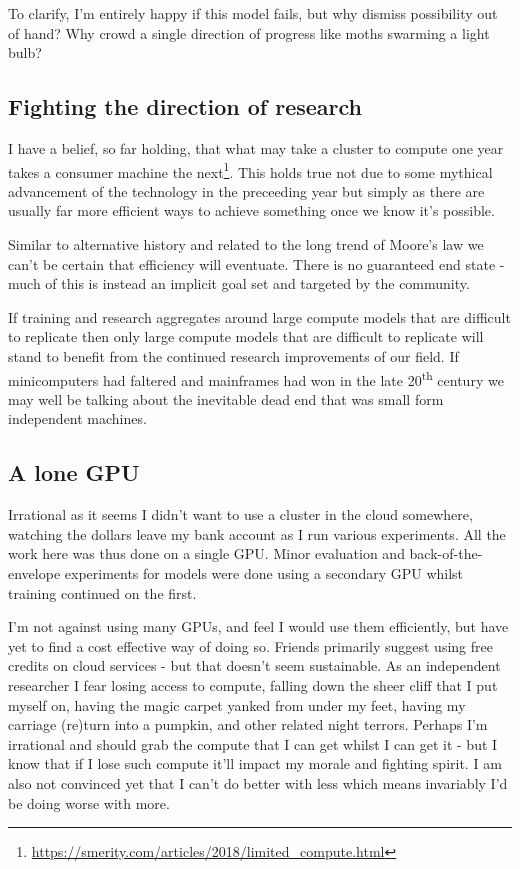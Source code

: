 \documentclass{article}
\begin{document}
To clarify, I'm entirely happy if this model fails, but why dismiss possibility out of hand?
Why crowd a single direction of progress like moths swarming a light bulb?

\subsection{Fighting the direction of research}

I have a belief, so far holding, that what may take a cluster to compute one year takes a consumer machine the next\footnote{\url{https://smerity.com/articles/2018/limited_compute.html}}.
This holds true not due to some mythical advancement of the technology in the preceeding year but simply as there are usually far more efficient ways to achieve something once we know it's possible.

Similar to alternative history and related to the long trend of Moore's law we can't be certain that efficiency will eventuate.
There is no guaranteed end state - much of this is instead an implicit goal set and targeted by the community.

If training and research aggregates around large compute models that are difficult to replicate then only large compute models that are difficult to replicate will stand to benefit from the continued research improvements of our field.
If minicomputers had faltered and mainframes had won in the late 20\textsuperscript{th} century we may well be talking about the inevitable dead end that was small form independent machines.


\subsection{A lone GPU}

Irrational as it seems I didn't want to use a cluster in the cloud somewhere, watching the dollars leave my bank account as I run various experiments.
All the work here was thus done on a single GPU.
Minor evaluation and back-of-the-envelope experiments for models were done using a secondary GPU whilst training continued on the first.

I'm not against using many GPUs, and feel I would use them efficiently, but have yet to find a cost effective way of doing so.
Friends primarily suggest using free credits on cloud services - but that doesn't seem sustainable.
As an independent researcher I fear losing access to compute, falling down the sheer cliff that I put myself on, having the magic carpet yanked from under my feet, having my carriage (re)turn into a pumpkin, and other related night terrors.
Perhaps I'm irrational and should grab the compute that I can get whilst I can get it - but I know that if I lose such compute it'll impact my morale and fighting spirit.
I am also not convinced yet that I can't do better with less which means invariably I'd be doing worse with more.
\end{document}
